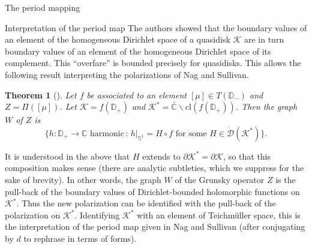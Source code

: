 \documentclass[12pt]{amsart}
\newcommand{\disk}{\ensuremath{\mathbb{D}} } %
\newcommand{\sphere}{\bar{\Bbb{C}}} %
\renewcommand{\Bbb}[1]{\ensuremath{\mathbb{#1}}}
\newcommand{\kap}{\mathscr{K}}
\theoremstyle{plain}
\newtheorem{theorem}{Theorem}[section]
\theoremstyle{definition}
\theoremstyle{remark}
\numberwithin{equation}{section} %
\numberwithin{figure}{section} %
\begin{document}
\begin{section}{The period mapping}
\begin{subsection}{Interpretation of the period map}
  The authors showed that the boundary values of an element of the homogeneous Dirichlet space of a quasidisk $\kap$ are in turn boundary values of an element of the homogeneous Dirichlet space of its complement. This ``overfare'' is bounded precisely for quasidisks. This allows the following result interpreting the polarizations of Nag and Sullivan. 
  \begin{theorem}[\cite{RadnellSchippersStaubach_Grunsky_genuszero}]  \label{th:graph_of_Grunsky}
    Let $f$ be associated to an element $[\mu] \in T(\disk_-)$ and $Z= \Pi([\mu])$. Let $\kap = f(\disk_+)$ and $\kap^* = \sphere \backslash \mathrm{cl} (f(\disk_+))$.   Then the graph $W$ of $Z$ is 
    \[  \{ h:\disk_+ \rightarrow \mathbb{C} \text{ harmonic} \,: \, \left. h \right|_{\mathbb{S}^1} = H \circ f \text{ for some } H \in \dot{\mathcal{D}}(\kap^*) \}.  \]
  \end{theorem}
  It is understood in the above that $H$ extends to $\partial \kap^*=\partial \kap$, so that this composition makes sense (there are analytic subtleties, which we suppress for the sake of brevity).
  In other words, the graph $W$ of the Grunsky operator $Z$ is the pull-back of the boundary values of Dirichlet-bounded holomorphic functions on $\kap^*$. {Thus the new polarization  can be identified with the pull-back of the polarization on $\kap^*$. Identifying $\kap^*$ with an element of Teichm\"uller space, this is the interpretation of the period map given in Nag and Sullivan \cite{NagSullivan} (after conjugating by $d$ to rephrase in terms of forms).   }\\
  

\end{subsection}
\end{section}
\end{document}
